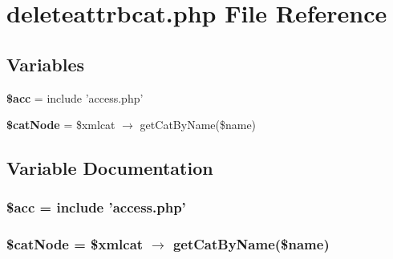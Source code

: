 \section{deleteattrbcat.php File Reference}
\label{deleteattrbcat_8php}


\subsection*{Variables}
\begin{CompactItemize}
\item 
{\bf \$acc} = include 'access.php'
\item 
{\bf \$cat\-Node} = \$xmlcat $\rightarrow$ get\-Cat\-By\-Name(\$name)
\end{CompactItemize}


\subsection{Variable Documentation}
\subsubsection{\setlength{\rightskip}{0pt plus 5cm}\$acc = include 'access.php'}\label{deleteattrbcat_8php_542926c588a05eb69553d79c83cf73da}


\subsubsection{\setlength{\rightskip}{0pt plus 5cm}\$cat\-Node = \$xmlcat $\rightarrow$ get\-Cat\-By\-Name(\$name)}\label{deleteattrbcat_8php_6b6a3d0442eb8cc5ad00f6cca24e154f}


